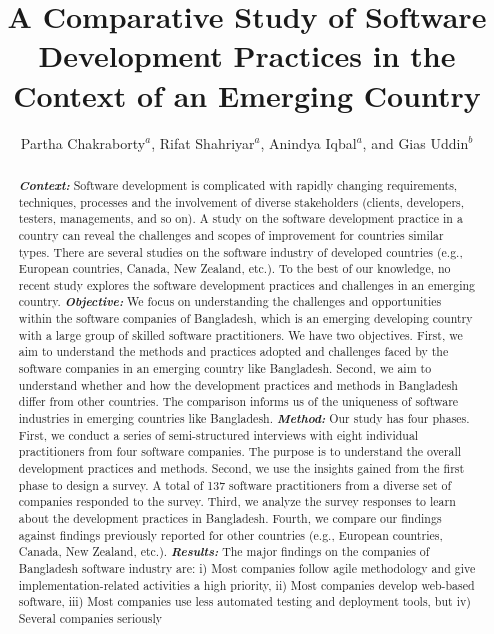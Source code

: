 \documentclass[review]{elsarticle}
\title{A Comparative Study of Software Development Practices in the Context of an Emerging Country}
\def\it{\textit}
\newcounter{finding_counter}
\begin{document}
\begin{frontmatter}



\author{Partha Chakraborty$^a$, Rifat Shahriyar$^a$, Anindya Iqbal$^a$, and Gias Uddin$^b$}
\address{$^a$Bangladesh University of Engineering and Technology and $^b$University of Calgary}
\begin{abstract}\textbf{\it{Context:}}
Software development is complicated with rapidly changing requirements, techniques, processes and 
the involvement of diverse stakeholders (clients, developers, testers, managements, and so on). 
A study on the software development practice in a country
can reveal the challenges and scopes of improvement for countries similar types. There are several studies on the software industry
of developed countries (e.g., European countries, Canada, 
New Zealand, etc.). To the best of our knowledge, no recent study explores the software development practices and challenges
in an emerging country. 
\textbf{\it{Objective:}} We focus on understanding the challenges and
opportunities within the software companies of Bangladesh, which is an emerging
developing country with a large group of skilled software practitioners. We have
two objectives. First, we aim to understand the methods and practices 
adopted and challenges faced by the software companies in an emerging
country like Bangladesh. Second, we aim  to understand whether and how the development practices
and methods in Bangladesh differ from other countries. The comparison informs us
of the uniqueness of software industries in emerging countries like Bangladesh.
\textbf{\it{Method:}} Our study has four phases. First, we conduct a series of
semi-structured interviews with eight individual practitioners from four
software companies. The purpose is to understand the overall development
practices and methods. Second, we use the insights gained from the first phase
to design a survey. A total of 137 software practitioners from a diverse set of
companies responded to the survey. Third, we analyze the survey responses to learn about the development 
practices in Bangladesh. Fourth, we compare our findings against findings previously reported for other countries (e.g., European countries, Canada, 
New Zealand, etc.).
\textbf{\it{Results:}} The major findings on the companies of
Bangladesh software industry are: i) Most companies follow agile methodology
and give implementation-related activities a high priority, ii) Most companies
develop web-based software, iii) Most companies use less
automated testing and deployment tools, but iv) Several companies seriously

\end{abstract}
\end{frontmatter}
\end{document}
